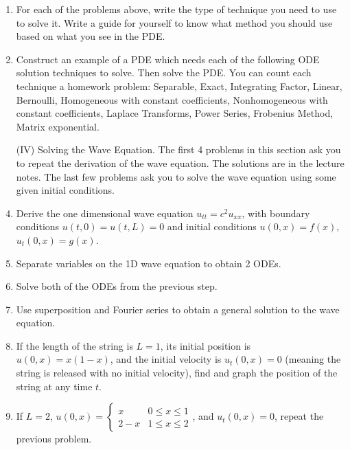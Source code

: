 {\begin{enumerate}
	\item For each of the problems above, write the type of technique you need to use to solve it. Write a guide for yourself to know what method you should use based on what you see in the PDE.
	\item Construct an example of a PDE which needs each of the following ODE solution techniques to solve. Then solve the PDE.  You can count each technique a homework problem:
	Separable, 
	Exact,
	Integrating Factor,
	Linear,
	 Bernoulli,
	 Homogeneous with constant coefficients,
	 Nonhomogeneous with constant coefficients,
	 Laplace Transforms,
	 Power Series,
	 Frobenius Method,
	 Matrix exponential.



\item[(IV)] Solving the Wave Equation. The first 4 problems in this section ask you to repeat the derivation of the wave equation.  The solutions are in the lecture notes.  The last few problems ask you to solve the wave equation using some given initial conditions.

  \item Derive the one dimensional wave equation $u_{tt} = c^2 u_{xx}$, with boundary conditions $u(t,0)=u(t,L) = 0$ and initial conditions $u(0,x) = f(x)$, $u_t(0,x)=g(x)$.
  \item Separate variables on the 1D wave equation to obtain 2 ODEs.
  \item Solve both of the ODEs from the previous step.
  \item Use superposition and Fourier series to obtain a general solution to the wave equation.
 
 	\item If the length of the string is $L=1$, its initial position is $u(0,x) = x(1-x)$, and the initial velocity is $u_t(0,x)=0$ (meaning the string is released with no initial velocity), find and graph the position of the string at any time $t$.
 	\item If $L=2$, $u(0,x) = \begin{cases}x & 0\leq x\leq 1\\2-x & 1\leq x\leq 2\end{cases}$, and $u_t(0,x)=0$, repeat the previous problem.
 	
\end{enumerate}
}